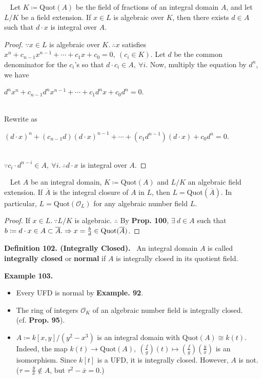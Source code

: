 \documentclass[12pt,a4paper,footinclude=true,headinclude=true]{scrbook} %
\newenvironment{lemma}[2][]
{\renewcommand\theinnercustomlemma{#2}\innercustomlemma[#1]
\begin{mdframed}[backgroundcolor=gray!20]\ }
{\end{mdframed}\endinnercustomprop}
\newenvironment{corollary}[2][]
{\renewcommand\theinnercustomcol{#2}\innercustomcol[#1]
\begin{mdframed}[backgroundcolor=gray!20]\ }
{\end{mdframed}\endinnercustomcol}
\newenvironment{definition}[2][Definition]
    { \begin{mdframed}[backgroundcolor=gray!20] \textbf{#1 #2.}\ }
    {  \end{mdframed}}
\newenvironment{example}[2][Example]
    { \begin{mdframed}[backgroundcolor=gray!20] \textbf{#1 #2.} }
    {  \end{mdframed}}
\begin{document}
\begin{lemma}{100}
    Let $K\coloneqq\mathrm{Quot}(A)$ be the field of fractions of an integral domain $A$, and let $L/K$ be a field extension. If $x\in L$ is algebraic over $K$, then there exists $d\in A$ such that $d\cdot x$ is integral over $A$.
\end{lemma}
\begin{proof}
    $\because x\in L$ is algebraic over $K.\ \therefore x$ satisfies $x^n+ c_{n-1}x^{n-1}+\cdots+c_1x+c_0=0,\ (c_i\in K)$. Let $d$ be the common denominator for the $c_i$'s so that $d\cdot c_i\in A,\ \forall i$. Now, multiply the equation by $d^n$, we have\\  \centerline{$d^nx^n+ c_{n-1}d^nx^{n-1}+ \cdots +c_1d^nx+c_0d^n=0.$}\\ Rewrite as \\ \centerline{$(d\cdot x)^n+(c_{n-1}d)(d\cdot x)^{n-1}+ \cdots+(c_1d^{n-1})(d\cdot x)+c_0d^n=0$.} \\ $\because c_i\cdot d^{n-i}\in A,\ \forall i.\ \therefore d\cdot x$ is integral over $A$.
\end{proof}

\begin{corollary}{101}
    Let $A$ be an integral domain, $K\coloneqq\mathrm{Quot}(A)$ and $L/K$ an algebraic field extension. If $\overline{A}$ is the integral closure of $A$ in $L$, then $L=\mathrm{Quot}(\overline{A})$. In particular, $L=\mathrm{Quot}(\mathcal{O}_L)$ for any algebraic number field $L$.
\end{corollary}
\begin{proof}
    If $x\in L.\ \because L/K$ is algebraic. $\therefore$ By \textbf{Prop. 100}, $\exists\ d\in A$ such that $b\coloneqq d\cdot x\in A\subset\overline{A}.\\  \Rightarrow x=\frac{b}{d}\in\mathrm{Quot}(\overline{A})$.  
\end{proof}

\begin{definition}{102. (Integrally Closed)}
    An integral domain $A$ is called \textbf{integrally closed} or \textbf{normal} if $A$ is integrally closed in its quotient field.
\end{definition}

\begin{example}{103}
    \begin{itemize}
        \item Every UFD is normal by \textbf{Example. 92}.
        \item The ring of integers $\mathcal{O}_K$ of an algebraic number field is integrally closed.\\ (cf. \textbf{Prop. 95}).
        \item $A\coloneqq k[x,y]/(y^2-x^3)$ is an integral domain with $\mathrm{Quot}(A)\cong k(t)$. \\
        Indeed, the map $k(t)\to\mathrm{Quot}(A),\ (\frac{f}{g})(t)\mapsto (\frac{f}{g})(\frac{\overline{y}}{\overline{x}})$ is an isomorphism. Since $k[t]$ is a UFD, it is integrally closed. However, $A$ is not. ($\tau=\frac{\overline{y}}{\overline{x}}\notin A$, but $\tau^2-\overline{x}=0$.)
    \end{itemize}
\end{example}
\end{document}
